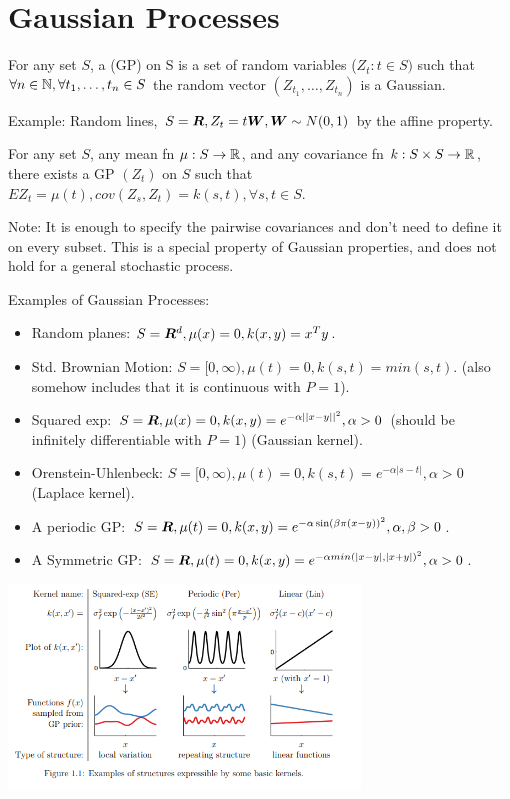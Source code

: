 
\chapter{Gaussian Processes}

\begin{defn}
    For any set $S$, a  (GP) on S is a set of random variables ($Z_t : t \in S)$ such that $\forall n \in {\mathbb{N}}, \forall t_1, \dots, t_n \in S$ the random vector $(Z_{t_1}, \dots, Z_{t_n})$ is a Gaussian.
\end{defn}

Example: Random lines, $S = {\bm{R}}, Z_t = t {\bm{W}}, {\bm{W}} \sim N(0, 1)$ by the affine property.

\begin{thm}
    For any set $S$, any mean fn $\mu : S \rightarrow {\mathbb{R}}$, and any covariance fn $k : S \times S \rightarrow {\mathbb{R}}$, there exists a GP $(Z_t)$ on $S$ such that $E Z_t = \mu(t), cov(Z_s, Z_t) = k(s, t), \forall s,t \in S$.
\end{thm}

Note: It is enough to specify the pairwise covariances and don't need to define it on every subset. This is a special property of Gaussian properties, and does not hold for a general stochastic process.

Examples of Gaussian Processes:

\begin{itemize}
    \item Random planes: $S = {\bm{R}}^d, \mu(x) = 0, k(x,y) = x^T y$.
    \item Std. Brownian Motion: $S = [0, \infty), \mu(t) = 0, k(s, t) = min(s, t)$. (also somehow includes that it is continuous with $P = 1$).
    \item Squared exp: $S = {\bm{R}}, \mu(x) = 0, k(x,y) = e^{-\alpha ||x - y||^2}, \alpha > 0$ (should be infinitely differentiable with $P = 1$) (Gaussian kernel).
    \item Orenstein-Uhlenbeck: $S = [0, \infty), \mu(t) = 0, k(s, t) = e^{-\alpha |s - t|}, \alpha > 0$ (Laplace kernel).
    \item A periodic GP: $S = {\bm{R}}, \mu(t) = 0, k(x, y) = e^{-\alpha \sin(\beta\pi(x - y))^2}, \alpha, \beta > 0$.
    \item A Symmetric GP: $S = {\bm{R}}, \mu(t) = 0, k(x, y) = e^{-\alpha min(|x-y|, |x+y|)^2}, \alpha>0$.
\end{itemize}

\includegraphics[width=0.7\textwidth]{img/kernels}

